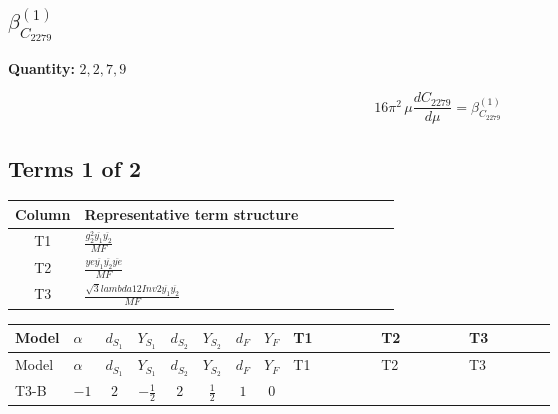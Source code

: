 \documentclass[8pt]{article}
\begin{document}
\begin{landscape}
\section*{$\beta_{C_{2279}}^{(1)}$}
\noindent\textbf{Quantity: }$\mathrm{2,2,7,9}$\par\smallskip
\[16\pi^2\,\mu\frac{d C_{2279}}{d\mu}=\beta_{C_{2279}}^{(1)}\]
\subsection*{Terms 1 of 2}
\begin{center}
\begin{tabular}{@{}c >{\raggedright\arraybackslash}p{0.82\linewidth}@{}}
\toprule
Column & Representative term structure \\
\midrule
T1 & \(\displaystyle \frac{g_{2}^{2} \overline{y_{1}} \overline{y_{2}}}{MF}\) \\
\midrule
T2 & \(\displaystyle \frac{ye \overline{y_{1}} \overline{y_{2}} \overline{ye}}{MF}\) \\
\midrule
T3 & \(\displaystyle \frac{\sqrt{3} lambda12Inv2 \overline{y_{1}} \overline{y_{2}}}{MF}\) \\
\midrule
\bottomrule
\end{tabular}
\end{center}
\smallskip
\tiny
\begin{longtable}{@{}llcccccc >{\raggedright\arraybackslash}p{0.21\linewidth} >{\raggedright\arraybackslash}p{0.21\linewidth} >{\raggedright\arraybackslash}p{0.21\linewidth}@{}}
\toprule
Model & $\alpha$ & $d_{S_1}$ & $Y_{S_1}$ & $d_{S_2}$ & $Y_{S_2}$ & $d_F$ & $Y_F$ & T1 & T2 & T3 \\
\midrule
\endfirsthead
\toprule
Model & $\alpha$ & $d_{S_1}$ & $Y_{S_1}$ & $d_{S_2}$ & $Y_{S_2}$ & $d_F$ & $Y_F$ & T1 & T2 & T3 \\
\midrule
\endhead
T3-B & $-1$ & $2$ & $-\frac{1}{2}$ & $2$ & $\frac{1}{2}$ & $1$ & $0$ & \scriptsize\adjustbox{max width=\linewidth}{$\begin{gathered} \frac{3 g_{2}^{2} \overline{y_{1}} \overline{y_{2}}}{4 MF}\end{gathered}$} & \scriptsize\adjustbox{max width=\linewidth}{$\begin{gathered} - \frac{ye \overline{y_{1}} \overline{y_{2}} \overline{ye}}{4 MF}\end{gathered}$} & \scriptsize\adjustbox{max width=\linewidth}{$\begin{gathered} \frac{\sqrt{3} lambda12Inv2 \overline{y_{1}} \overline{y_{2}}}{3 MF}\end{gathered}$} \\

\end{longtable}
\end{landscape}
\end{document}
